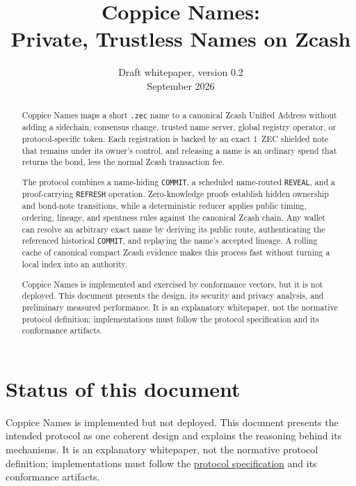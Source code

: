 \documentclass[11pt]{article}
\title{Coppice Names:\\Private, Trustless Names on Zcash}
\author{}
\date{Draft whitepaper, version 0.2\\September 2026}
\newcommand{\operation}[1]{\texttt{#1}}
\newcommand{\code}[1]{\texttt{#1}}
\begin{document}
\maketitle

\begin{abstract}
Coppice Names maps a short \code{.zec} name to a canonical Zcash Unified
Address without adding a sidechain, consensus change, trusted name server,
global registry operator, or protocol-specific token. Each registration is
backed by an exact 1~ZEC shielded note that remains under its owner's control,
and releasing a name is an ordinary spend that returns the bond, less the
normal Zcash transaction fee.

The protocol combines a name-hiding \operation{COMMIT}, a scheduled
name-routed \operation{REVEAL}, and a proof-carrying \operation{REFRESH}
operation. Zero-knowledge proofs establish hidden ownership and bond-note
transitions, while a deterministic reducer applies public timing, ordering,
lineage, and spentness rules against the canonical Zcash chain. Any wallet can
resolve an arbitrary exact name by deriving its public route, authenticating
the referenced historical \operation{COMMIT}, and replaying the name's
accepted lineage. A rolling cache of canonical compact Zcash evidence makes
this process fast without turning a local index into an authority.

Coppice Names is implemented and exercised by conformance vectors, but it is
not deployed. This document presents the design, its security and privacy
analysis, and preliminary measured performance. It is an explanatory
whitepaper, not the normative protocol definition; implementations must follow
the protocol specification and its conformance artifacts.
\end{abstract}

\section*{Status of this document}

Coppice Names is implemented but not deployed. This document presents the
intended protocol as one coherent design and explains the reasoning behind its
mechanisms. It is an explanatory whitepaper, not the normative protocol
definition; implementations must follow the
\href{https://github.com/nfl0/coppice-names/blob/main/docs/SPECIFICATION.md}{protocol
specification} and its conformance artifacts.
\end{document}
